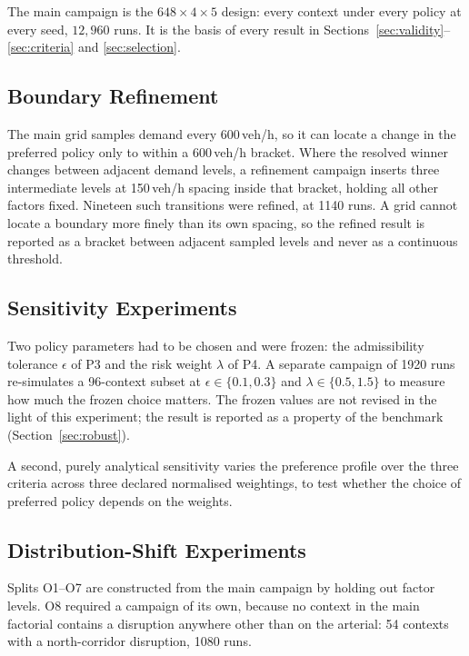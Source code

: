 \documentclass[preprint,12pt]{elsarticle}
\begin{document}
The main campaign is the $648 \times 4 \times 5$ design: every context under
every policy at every seed, $12{,}960$ runs. It is the basis of every result in
Sections~\ref{sec:validity}--\ref{sec:criteria} and \ref{sec:selection}.

\subsection{Boundary Refinement}
\label{sec:design:boundary}

The main grid samples demand every 600\,veh/h, so it can locate a change in the
preferred policy only to within a 600\,veh/h bracket. Where the resolved winner
changes between adjacent demand levels, a refinement campaign inserts three
intermediate levels at 150\,veh/h spacing inside that bracket, holding all other
factors fixed. Nineteen such transitions were refined, at 1140 runs. A grid
cannot locate a boundary more finely than its own spacing, so the refined result
is reported as a bracket between adjacent sampled levels and never as a
continuous threshold.

\subsection{Sensitivity Experiments}
\label{sec:design:sens}

Two policy parameters had to be chosen and were frozen: the admissibility
tolerance $\epsilon$ of P3 and the risk weight $\lambda$ of P4. A separate
campaign of 1920 runs re-simulates a 96-context subset at
$\epsilon \in \{0.1, 0.3\}$ and $\lambda \in \{0.5, 1.5\}$ to measure how much
the frozen choice matters. The frozen values are not revised in the light of this
experiment; the result is reported as a property of the benchmark
(Section~\ref{sec:robust}).

A second, purely analytical sensitivity varies the preference profile over the
three criteria across three declared normalised weightings, to test whether the
choice of preferred policy depends on the weights.

\subsection{Distribution-Shift Experiments}
\label{sec:design:shift}

Splits O1--O7 are constructed from the main campaign by holding out factor
levels. O8 required a campaign of its own, because no context in the main
factorial contains a disruption anywhere other than on the arterial: 54 contexts
with a north-corridor disruption, 1080 runs.
\end{document}
